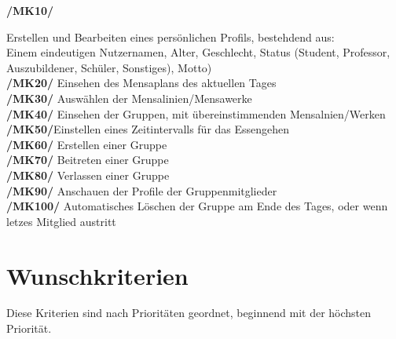 \documentclass[a4paper]{scrreprt}
\begin{document}
\begin{addmargin}[25pt]{0pt} 
\hypertarget{mk10}{\textbf{/MK10/}} Erstellen und Bearbeiten eines persönlichen Profils, bestehdend aus: \\ Einem eindeutigen Nutzernamen, Alter, Geschlecht, Status (Student, Professor, Auszubildener, Schüler, Sonstiges), Motto)\\
\hypertarget{mk20}{\textbf{/MK20/}} Einsehen des Mensaplans des aktuellen Tages\\
\hypertarget{mk30}{\textbf{/MK30/}} Auswählen der Mensalinien/Mensawerke\\
\hypertarget{mk40}{\textbf{/MK40/}} Einsehen der Gruppen, mit übereinstimmenden Mensalnien/Werken\\
\hypertarget{mk50}{\textbf{/MK50/}}Einstellen eines Zeitintervalls für das Essengehen \\
\hypertarget{mk60}{\textbf{/MK60/}} Erstellen einer Gruppe\\
\hypertarget{mk70}{\textbf{/MK70/}} Beitreten einer Gruppe\\
\hypertarget{mk80}{\textbf{/MK80/}} Verlassen einer Gruppe\\
\hypertarget{mk90}{\textbf{/MK90/}} Anschauen der Profile der Gruppenmitglieder\\
\hypertarget{mk100}{\textbf{/MK100/}} Automatisches Löschen der Gruppe am Ende des Tages, oder wenn letzes Mitglied austritt\\
\end{addmargin}

\section{Wunschkriterien}
Diese Kriterien sind nach Prioritäten geordnet, beginnend mit der höchsten Priorität.
\end{document}
